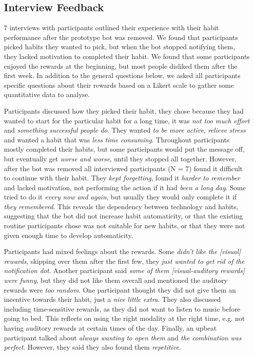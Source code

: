 \documentclass{scaffold/sigchi}
\begin{document}
\subsection{Interview Feedback}
7 interviews with participants outlined their experience with their habit performance after the prototype bot was removed. We found that participants picked habits they wanted to pick, but when the bot stopped notifying them, they lacked motivation to completed their habit. We found that some participants enjoyed the rewards at the beginning, but most people disliked them after the first week. In addition to the general questions below, we asked all participants specific questions about their rewards based on a Likert scale to gather some quantitative data to analyse.


Participants discussed how they picked their habit, they chose because they had wanted to start for the particular habit for a long time, it was \textit{not too much effort} and \textit{something successful people do}. They wanted \textit{to be more active}, \textit{relieve stress} and wanted a habit that was \textit{less time consuming}. Throughout participants mostly completed their habits, but some participants would put the message off, but eventually get \textit{worse and worse}, until they stopped all together. However, after the bot was removed all interviewed participants (N = 7) found it difficult to continue with their habit. They \textit{kept forgetting}, found it \textit{harder to remember} and lacked motivation, not performing the action if it had \textit{been a long day}. Some tried to do it \textit{every now and again}, but usually they would only complete it if \textit{they remembered}. This reveals the dependency between technology and habits, suggesting that the bot did not increase habit automaticity, or that the existing routine participants chose was not suitable for new habits, or that they were not given enough time to develop automaticity.


Participants had mixed feelings about the rewards. Some \textit{didn't like the [visual] rewards}, skipping over them after the first few, they \textit{just wanted to get rid of the notification dot}. Another participant said \textit{some of them [visual-auditory rewards] were funny}, but they did not like them overall and mentioned the auditory rewards were \textit{too random}. One participant thought they did not give them an incentive towards their habit, just a \textit{nice little extra}. They also discussed including time-sensitive rewards, as they did not want to listen to music before going to bed. This reflects on using the right modality at the right time, e.g. not having auditory rewards at certain times of the day. Finally, an upbeat participant talked about \textit{always wanting to open them} and \textit{the combination was perfect}. However, they said they also found them \textit{repetitive}.
\end{document}
